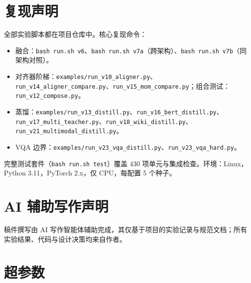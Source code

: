 \documentclass[10pt,twoside]{article}
\begin{document}
\section*{复现声明}
\label{sec:repro}

全部实验脚本都在项目仓库中。核心复现命令：

\begin{itemize}[leftmargin=1.6em, itemsep=0.5pt, parsep=0pt]
    \item 融合：\texttt{bash run.sh v6}、\texttt{bash run.sh v7a}（跨架构）、\texttt{bash run.sh v7b}（同架构对照）。
    \item 对齐器阶梯：\texttt{examples/run\_v10\_aligner.py}、\texttt{run\_v14\_aligner\_compare.py}、\texttt{run\_v15\_mom\_compare.py}；组合测试：\texttt{run\_v12\_compose.py}。
    \item 蒸馏：\texttt{examples/run\_v13\_distill.py}、\texttt{run\_v16\_bert\_distill.py}、\texttt{run\_v17\_multi\_teacher.py}、\texttt{run\_v18\_wiki\_distill.py}、\texttt{run\_v21\_multimodal\_distill.py}。
    \item VQA 边界：\texttt{examples/run\_v23\_vqa\_distill.py}、\texttt{run\_v23\_vqa\_hard.py}。
\end{itemize}

完整测试套件（\texttt{bash run.sh test}）覆盖 430 项单元与集成检查。环境：Linux，Python 3.11，PyTorch 2.x，仅 CPU，每配置 5 个种子。

\section*{AI 辅助写作声明}

稿件撰写由 AI 写作智能体辅助完成，其仅基于项目的实验记录与规范文档；所有实验结果、代码与设计决策均来自作者。




\appendix

\clearpage

\section{超参数}
\label{app:hyper}
\end{document}
